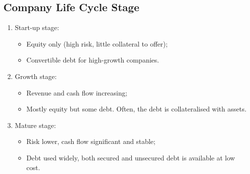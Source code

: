 \documentclass[../notes_compiled.tex]{subfiles}
\begin{document}
\subsection{Company Life Cycle Stage}
\begin{enumerate}
\item Start-up stage:
\begin{itemize}
\item Equity only (high risk, little collateral to offer);
\item Convertible debt for high-growth companies.
\end{itemize}
\item Growth stage:
\begin{itemize}
\item Revenue and cash flow increasing;
\item Mostly equity but some debt. Often, the debt is collateralised with assets.
\end{itemize}
\item Mature stage:
\begin{itemize}
\item Risk lower, cash flow significant and stable;
\item Debt used widely, both secured and unsecured debt is available at low cost.
\end{itemize}
\end{enumerate}
\end{document}
